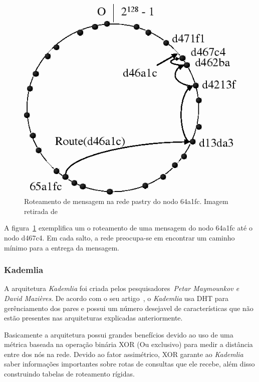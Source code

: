 \begin{figure}
	\centering
	\includegraphics[scale=0.5]{images/roteamento-pastry.png}
	\caption{Roteamento de mensagem na rede pastry do nodo 64a1fc. Imagem retirada de~\cite{rowstron01}}
	\label{fig:roteamento-pastry}
\end{figure}

A figura~\ref{fig:roteamento-pastry} exemplifica um o roteamento de uma mensagem do nodo 64a1fc até o nodo d467c4. Em cada salto, a rede preocupa-se em encontrar um caminho mínimo para a entrega da mensagem.

\subsubsection{Kademlia}

A arquitetura \emph{Kademlia} foi criada pelos pesquisadores~\emph{Petar Maymounkov e David Mazières}. De acordo com o seu artigo~\cite{maymounkov02}, o \emph{Kademlia} usa DHT para gerênciamento dos pares e possui um número desejavel de características que não estão presentes nas arquiteturas explicadas anteriormente.

Basicamente a arquitetura possui grandes benefícios devido ao uso de uma métrica baseada na operação binária XOR (Ou exclusivo) para medir a distância entre dos nós na rede. Devido ao fator assimétrico, XOR garante ao \emph{Kademlia} saber informações importantes sobre rotas de consultas que ele recebe, além disso construindo tabelas de roteamento rígidas.

